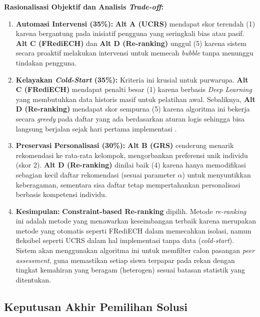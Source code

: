 \textbf{Rasionalisasi Objektif dan Analisis \textit{Trade-off}:}
\begin{enumerate}
    \item \textbf{Automasi Intervensi (35\%):} \textbf{Alt A (UCRS)} mendapat skor terendah (1) karena bergantung pada inisiatif pengguna yang seringkali bias atau pasif. \textbf{Alt C (FRediECH)} dan \textbf{Alt D (Re-ranking)} unggul (5) karena sistem secara proaktif melakukan intervensi untuk memecah \textit{bubble} tanpa menunggu tindakan pengguna.
    
    \item \textbf{Kelayakan \textit{Cold-Start} (35\%):} Kriteria ini krusial untuk purwarupa. \textbf{Alt C (FRediECH)} mendapat penalti besar (1) karena berbasis \textit{Deep Learning} yang membutuhkan data historis masif untuk pelatihan awal. Sebaliknya, \textbf{Alt D (Re-ranking)} mendapat skor sempurna (5) karena algoritma ini bekerja secara \textit{greedy} pada daftar yang ada berdasarkan aturan logis sehingga bisa langsung berjalan sejak hari pertama implementasi \autocite{DeBiasio2023}.
    
    \item \textbf{Preservasi Personalisasi (30\%):} \textbf{Alt B (GRS)} cenderung menarik rekomendasi ke rata-rata kelompok, mengorbankan preferensi unik individu (skor 2). \textbf{Alt D (Re-ranking)} dinilai baik (4) karena hanya memodifikasi sebagian kecil daftar rekomendasi (sesuai parameter $\alpha$) untuk menyuntikkan keberagaman, sementara sisa daftar tetap mempertahankan personalisasi berbasis kompetensi individu.
    
    \item \textbf{Kesimpulan:} \textbf{Constraint-based Re-ranking}
    \autocite{DeBiasio2023} dipilih. Metode \textit{re-ranking} ini adalah metode yang
    menawarkan
    keseimbangan terbaik karena merupakan metode yang
    otomatis seperti FRediECH dalam memecahkan
    isolasi, namun fleksibel seperti UCRS dalam hal implementasi tanpa
    data (\textit{cold-start}). Sistem akan menggunakan algoritma
    ini untuk memfilter calon pasangan \textit{peer assessment},
    guna memastikan setiap siswa terpapar pada rekan dengan tingkat
    kemahiran yang beragam (heterogen) sesuai batasan statistik yang
    ditentukan.
\end{enumerate}

\subsection{Keputusan Akhir Pemilihan Solusi}
\label{ssec:keputusan_akhir_pemilihan_solusi}

